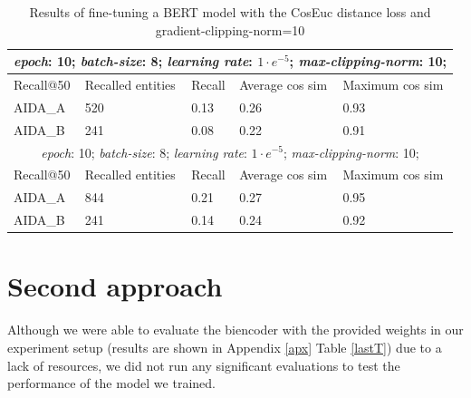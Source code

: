 \begin{table}[h!]
\centering
\captionsetup{justification=centering,margin=2cm}
\begin{tabular}{ |p{3cm}||p{2.5cm}||p{2.5cm}|p{2.5cm}|p{2.5cm}|}
 \hline
 \multicolumn{5}{|c|}{\textit{epoch}: 10; \textit{batch-size}: 8; \textit{learning rate}: $1 \cdot e^{-5}$; \textit{max-clipping-norm}: 10;}\\
 \hline   
  Recall@50 & Recalled entities & Recall  & Average cos sim & Maximum cos sim\\
 \hline 
 AIDA\_A & 520 & 0.13 & 0.26 & 0.93\\
 \hline
 AIDA\_B & 241 & 0.08 & 0.22 & 0.91\\
 \hline
 \multicolumn{5}{|c|}{\textit{epoch}: 10; \textit{batch-size}: 8; \textit{learning rate}: $1 \cdot e^{-5}$; \textit{max-clipping-norm}: 10;}\\
 \hline   
  Recall@50 & Recalled entities & Recall  & Average cos sim & Maximum cos sim\\
 \hline 
 AIDA\_A & 844 & 0.21 & 0.27 & 0.95\\
 \hline
 AIDA\_B & 241 & 0.14 & 0.24 & 0.92\\
 \hline
\end{tabular}
\caption{Results of fine-tuning a BERT model with the CosEuc distance loss and gradient-clipping-norm=10}
\label{BRound2}
\end{table}

\section{Second approach}
Although we were able to evaluate the biencoder with the provided weights in our experiment setup (results are shown in Appendix \ref{apx} Table \ref{lastT}) due to a lack of resources, we did not run any significant evaluations to test the performance of the model we trained.

